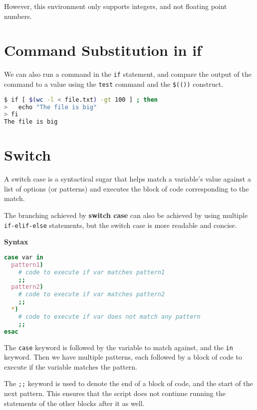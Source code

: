 However, this environment only supports integers, and not floating point numbers.

\section{Command Substitution in if}

We can also run a command in the \lstinline{if} statement, and compare the output of the command to a value using the \lstinline|test| command and the \lstinline|$(())| construct.

\begin{lstlisting}[language=bash]
$ if [ $(wc -l < file.txt) -gt 100 ] ; then
>   echo "The file is big"
> fi
The file is big
\end{lstlisting}

\section{Switch}

\begin{definition}
  A switch case is a syntactical sugar that helps match a variable's value against a list of options (or patterns) and executes the block of code corresponding to the match.
\end{definition}

The branching achieved by \textbf{switch case} can also be achieved by using multiple \lstinline{if-elif-else} statements, but the switch case is more readable and concise.

\textbf{Syntax}

\begin{lstlisting}[language=bash]
case var in
  pattern1)
    # code to execute if var matches pattern1
    ;;
  pattern2)
    # code to execute if var matches pattern2
    ;;
  *)
    # code to execute if var does not match any pattern
    ;;
esac
\end{lstlisting}

The \lstinline{case} keyword is followed by the variable to match against, and the \lstinline{in} keyword.
Then we have multiple patterns, each followed by a block of code to execute if the variable matches the pattern.

The \lstinline{;;} keyword is used to denote the end of a block of code, and the start of the next pattern. This ensures that the script does not continue running the statements of the other blocks after it as well.


